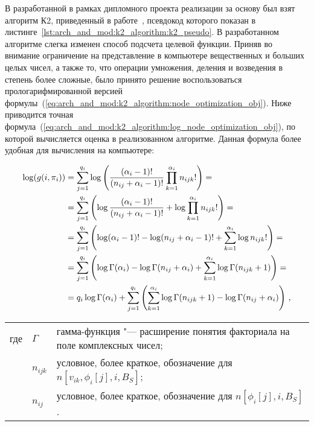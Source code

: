 В разработанной в рамках дипломного проекта реализации за основу был взят алгоритм К2, приведенный в работе~\cite{Cooper1991}, псевдокод которого показан в листинге~\ref{lst:arch_and_mod:k2_algorithm:k2_pseudo}.
В разработанном алгоритме слегка изменен способ подсчета целевой функции.
Приняв во внимание ограничение на представление в компьютере вещественных и больших целых чисел, а также то, что операции умножения, деления и возведения в степень более сложные, было принято решение воспользоваться прологарифмированной версией формулы~(\ref{eq:arch_and_mod:k2_algorithm:node_optimization_obj}).
Ниже приводится точная формула~(\ref{eq:arch_and_mod:k2_algorithm:log_node_optimization_obj}), по которой вычисляется оценка в реализованном алгоритме.
Данная формула более удобная для вычисления на компьютере:

\begin{align}
  \label{eq:arch_and_mod:k2_algorithm:log_node_optimization_obj}
  \log(g(i, \pi_i)) &=
    \sum_{j = 1}^{q_i}
      \log 
      \left(
        \frac{(\alpha_i - 1)!}
             {(n_{ij} + \alpha_{i} - 1)!}
        \prod_{k = 1}^{\alpha_i}
          n_{ijk}!
      \right) =\notag\\
    &=
    \sum_{j = 1}^{q_i}
      \left(
        \log
          \frac{(\alpha_i - 1)!}
               {(n_{ij} + \alpha_{i} - 1)!}
        +
        \log 
          \prod_{k = 1}^{\alpha_i}
            n_{ijk}!
      \right) =\notag\\
    &=
    \sum_{j = 1}^{q_i}
      \left(
        \log (\alpha_i - 1)! - \log (n_{ij} + \alpha_{i} - 1)!
        +
        \sum_{k = 1}^{\alpha_i}
          \log n_{ijk}!
      \right) =\notag\\
    &=
      \sum_{j = 1}^{q_i}
      \left(
        \log \Gamma(\alpha_i) - \log \Gamma(n_{ij} + \alpha_{i})
        +
        \sum_{k = 1}^{\alpha_i}
          \log \Gamma(n_{ijk} + 1)
      \right) = \notag\\
    &=
      q_i \log \Gamma(\alpha_i) +
      \sum_{j = 1}^{q_i}
      \left(
        \sum_{k = 1}^{\alpha_i}
          \log \Gamma(n_{ijk} + 1)
        - \log \Gamma(n_{ij} + \alpha_{i})
      \right) \text{\,,}
\end{align}
\par
\begin{tabular}{@{}ll@{ --- }p{}}
где & $ \Gamma $ & гамма-функция "---  расширение понятия факториала на поле комплексных чисел; \\
    & $ n_{ijk} $ & условное, более краткое, обозначение для $n[v_{ik}, \phi_i[j], i, B_S]$; \\
    & $ n_{ij} $ & условное, более краткое, обозначение для $n[\phi_i[j], i, B_S]$. \\[\parsep]
\end{tabular}

